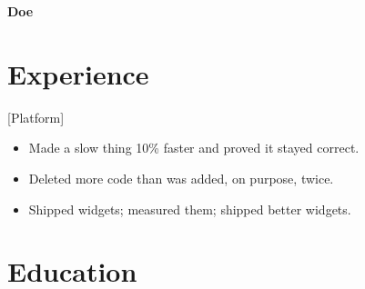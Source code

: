 \documentclass[paper=letter, fontsize=10pt]{resume}
\begin{document}
\begin{center}
  {\sans\bfseries\Huge {} Doe}\\[bind]
\end{center}

\section*{Experience}

[Platform]
\begin{itemize}
  \item Made a slow thing 10\% faster and proved it stayed correct.
  \item Deleted more code than was added, on purpose, twice.
\end{itemize}

\begin{itemize}
  \item Shipped widgets; measured them; shipped better widgets.
\end{itemize}

\section*{Education}

\end{document}
